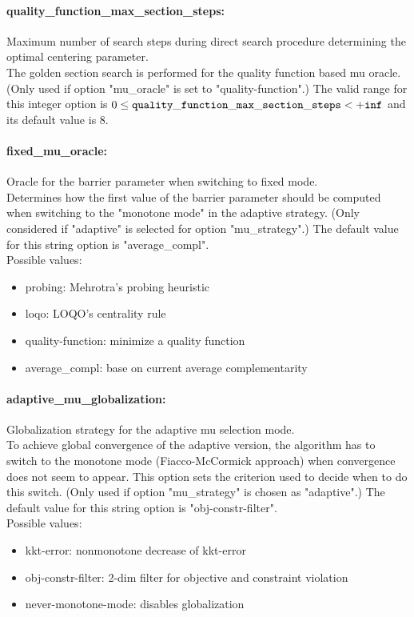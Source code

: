 \paragraph{quality\_function\_max\_section\_steps:}\label{opt:quality_function_max_section_steps} Maximum number of search steps during direct search procedure determining the optimal centering parameter. \\
 The golden section search is performed for the
quality function based mu oracle. (Only used if
option "mu\_oracle" is set to "quality-function".) The valid range for this integer option is
$0 \le {\tt quality\_function\_max\_section\_steps } <  {\tt +inf}$
and its default value is $8$.


\paragraph{fixed\_mu\_oracle:}\label{opt:fixed_mu_oracle} Oracle for the barrier parameter when switching to fixed mode. \\
 Determines how the first value of the barrier
parameter should be computed when switching to
the "monotone mode" in the adaptive strategy.
(Only considered if "adaptive" is selected for
option "mu\_strategy".) The default value for this string option is "average\_compl".
\\ 
Possible values:
\begin{itemize}
   \item probing: Mehrotra's probing heuristic
   \item loqo: LOQO's centrality rule
   \item quality-function: minimize a quality function
   \item average\_compl: base on current average complementarity
\end{itemize}

\paragraph{adaptive\_mu\_globalization:}\label{opt:adaptive_mu_globalization} Globalization strategy for the adaptive mu selection mode. \\
 To achieve global convergence of the adaptive
version, the algorithm has to switch to the
monotone mode (Fiacco-McCormick approach) when
convergence does not seem to appear.  This option
sets the criterion used to decide when to do this
switch. (Only used if option "mu\_strategy" is
chosen as "adaptive".) The default value for this string option is "obj-constr-filter".
\\ 
Possible values:
\begin{itemize}
   \item kkt-error: nonmonotone decrease of kkt-error
   \item obj-constr-filter: 2-dim filter for objective and constraint
violation
   \item never-monotone-mode: disables globalization
\end{itemize}

